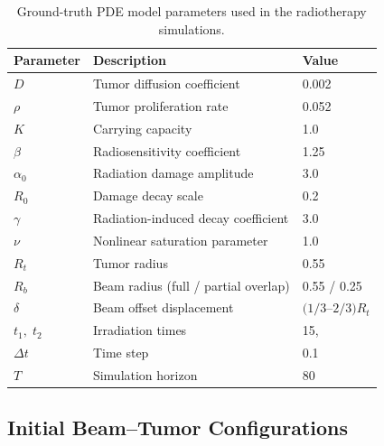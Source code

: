 \begin{table}[H]
\caption{Ground-truth PDE model parameters used in the radiotherapy simulations.}
\label{tab:pde_parameters}
\centering
\footnotesize
\setlength{\tabcolsep}{4pt}
\renewcommand{\arraystretch}{1.05}

\begin{tabular}{p{1.6cm} p{5.8cm} p{1.8cm}}
\hline
\textbf{Parameter} & \textbf{Description} & \textbf{Value} \\
\hline

$D$ & Tumor diffusion coefficient & 0.002 \\

$\rho$ & Tumor proliferation rate & 0.052 \\

$K$ & Carrying capacity & 1.0 \\

$\beta$ & Radiosensitivity coefficient & 1.25 \\

$\alpha_{0}$ & Radiation damage amplitude & 3.0 \\

$R_{0}$ & Damage decay scale & 0.2 \\

$\gamma$ & Radiation-induced decay coefficient & 3.0 \\

$\nu$ & Nonlinear saturation parameter & 1.0 \\

$R_t$ & Tumor radius & 0.55 \\

$R_b$ & Beam radius (full / partial overlap) & 0.55 / 0.25 \\

$\delta$ & Beam offset displacement & $(1/3$--$2/3)R_t$ \\

$t_1,\; t_2$ & Irradiation times & 15,\;45 \\

$\Delta t$ & Time step & 0.1 \\

$T$ & Simulation horizon & 80 \\
\hline
\end{tabular}
\end{table}
 

\subsection{Initial Beam--Tumor Configurations}

